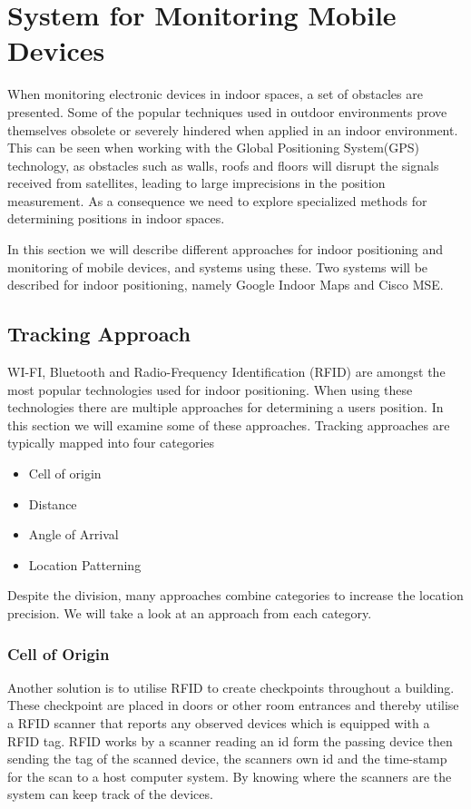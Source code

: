 \section{System for Monitoring Mobile Devices}\label{sec:monitoring}
When monitoring electronic devices in indoor spaces, a set of obstacles are presented. Some of the popular techniques used in outdoor environments prove themselves obsolete or severely hindered when applied in an indoor environment.  This can be seen when working with the Global Positioning System(GPS) technology, as obstacles such as walls, roofs and floors will disrupt the signals received from satellites, leading to large imprecisions in the position measurement. As a consequence we need to explore specialized methods for determining positions in indoor spaces.

In this section we will describe different approaches for indoor positioning and monitoring of mobile devices, and systems using these. Two systems will be described for indoor positioning, namely Google Indoor Maps and Cisco MSE.

\subsection{Tracking Approach}
WI-FI, Bluetooth and Radio-Frequency Identification (RFID) are amongst the most popular technologies used for indoor positioning. When using these technologies there are multiple approaches for determining a users position. In this section we will examine some of these approaches.
Tracking approaches are typically mapped into four categories\cite{tracking_approaches}
\begin{itemize}
\item Cell of origin
\item Distance
\item Angle of Arrival
\item Location Patterning
\end{itemize}
Despite the division, many approaches combine categories to increase the location precision. We will take a look at an approach from each category.

\subsubsection*{Cell of Origin}
Another solution is to utilise RFID to create checkpoints throughout a building. These checkpoint are placed in doors or other room entrances and thereby utilise a RFID scanner that reports any observed devices which is equipped with a RFID tag\cite{indoor_bin}. 
RFID works by a scanner reading an id form the passing device then sending the tag of the scanned device, the scanners own id and the time-stamp for the scan to a host computer system. By knowing where the scanners are the system can keep track of the devices\cite{RFIDjournal}.

